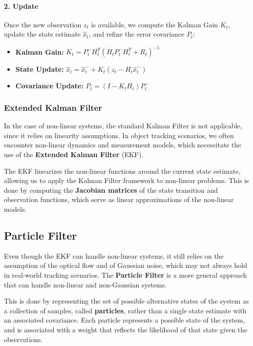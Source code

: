 \paragraph{2. Update}
Once the new observation $z_t$ is available, we compute the Kalman Gain $K_t$, update the state estimate $\hat{x}_t$,
and refine the error covariance $P_t$:
\begin{itemize}
    \item \textbf{Kalman Gain:} $K_t = P_t^- H_t^T (H_t P_t^- H_t^T + R_t)^{-1}$
    \item \textbf{State Update:} $\hat{x}_t = \hat{x}_t^- + K_t (z_t - H_t \hat{x}_t^-)$
    \item \textbf{Covariance Update:} $P_t = (I - K_t H_t) P_t^-$
\end{itemize}

\subsubsection{Extended Kalman Filter}
In the case of non-linear systems, the standard Kalman Filter is not applicable, since it relies on linearity assumptions.
In object tracking scenarios, we often encounter non-linear dynamics and measurement models, which necessitate the use of the \textbf{Extended Kalman Filter} (EKF).

The EKF linearizes the non-linear functions around the current state estimate, allowing us to apply the Kalman Filter framework to non-linear problems.
This is done by computing the \textbf{Jacobian matrices} of the state transition and observation functions, which serve as linear approximations of the non-linear models.

\subsection{Particle Filter}
Even though the EKF can handle non-linear systems, it still relies on the assumption of the optical flow and of Gaussian noise, 
which may not always hold in real-world tracking scenarios.
The \textbf{Particle Filter} is a more general approach that can handle non-linear and non-Gaussian systems.

This is done by representing the set of possible alternative states of the system as a collection of samples, called \textbf{particles}, rather than a single state estimate with an associated covariance.
Each particle represents a possible state of the system, and is associated with a weight that reflects the
likelihood of that state given the observations.

